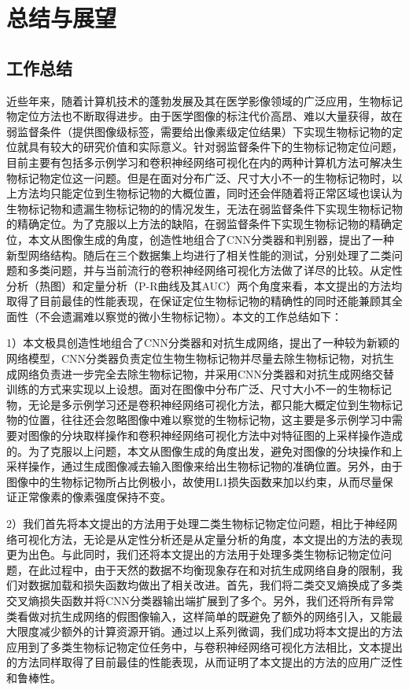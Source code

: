\chapter{总结与展望}
\section{工作总结}
近些年来，随着计算机技术的蓬勃发展及其在医学影像领域的广泛应用，生物标记物定位方法也不断取得进步。由于医学图像的标注代价高昂、难以大量获得，故在弱监督条件（提供图像级标签，需要给出像素级定位结果）下实现生物标记物的定位就具有较大的研究价值和实际意义。针对弱监督条件下的生物标记物定位问题，目前主要有包括多示例学习和卷积神经网络可视化在内的两种计算机方法可解决生物标记物定位这一问题。但是在面对分布广泛、尺寸大小不一的生物标记物时，以上方法均只能定位到生物标记物的大概位置，同时还会伴随着将正常区域也误认为生物标记物和遗漏生物标记物的的情况发生，无法在弱监督条件下实现生物标记物的精确定位。为了克服以上方法的缺陷，在弱监督条件下实现生物标记物的精确定位，本文从图像生成的角度，创造性地组合了CNN分类器和判别器，提出了一种新型网络结构。随后在三个数据集上均进行了相关性能的测试，分别处理了二类问题和多类问题，并与当前流行的卷积神经网络可视化方法做了详尽的比较。从定性分析（热图）和定量分析（P-R曲线及其AUC）两个角度来看，本文提出的方法均取得了目前最佳的性能表现，在保证定位生物标记物的精确性的同时还能兼顾其全面性（不会遗漏难以察觉的微小生物标记物）。本文的工作总结如下：

1）本文极具创造性地组合了CNN分类器和对抗生成网络，提出了一种较为新颖的网络模型，CNN分类器负责定位生物生物标记物并尽量去除生物标记物，对抗生成网络负责进一步完全去除生物标记物，并采用CNN分类器和对抗生成网络交替训练的方式来实现以上设想。面对在图像中分布广泛、尺寸大小不一的生物标记物，无论是多示例学习还是卷积神经网络可视化方法，都只能大概定位到生物标记物的位置，往往还会忽略图像中难以察觉的生物标记物，这主要是多示例学习中需要对图像的分块取样操作和卷积神经网络可视化方法中对特征图的上采样操作造成的。为了克服以上问题，本文从图像生成的角度出发，避免对图像的分块操作和上采样操作，通过生成图像减去输入图像来给出生物标记物的准确位置。另外，由于图像中的生物标记物所占比例极小，故使用L1损失函数来加以约束，从而尽量保证正常像素的像素强度保持不变。

2）我们首先将本文提出的方法用于处理二类生物标记物定位问题，相比于神经网络可视化方法，无论是从定性分析还是从定量分析的角度，本文提出的方法的表现更为出色。与此同时，我们还将本文提出的方法用于处理多类生物标记物定位问题，在此过程中，由于天然的数据不均衡现象存在和对抗生成网络自身的限制，我们对数据加载和损失函数均做出了相关改进。首先，我们将二类交叉熵换成了多类交叉熵损失函数并将CNN分类器输出端扩展到了多个。另外，我们还将所有异常类看做对抗生成网络的假图像输入，这样简单的既避免了额外的网络引入，又能最大限度减少额外的计算资源开销。通过以上系列微调，我们成功将本文提出的方法应用到了多类生物标记物定位任务中，与卷积神经网络可视化方法相比，文本提出的方法同样取得了目前最佳的性能表现，从而证明了本文提出的方法的应用广泛性和鲁棒性。


